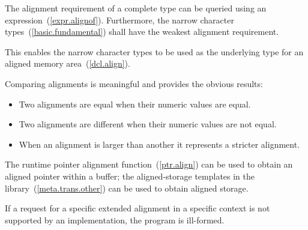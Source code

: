 \pnum
The alignment requirement of a complete type can be queried using an
 expression~(\ref{expr.alignof}). Furthermore,
the narrow character types~(\ref{basic.fundamental}) shall have the weakest
alignment requirement.
\begin{note} This enables the narrow character types to be used as the
underlying type for an aligned memory area~(\ref{dcl.align}).\end{note}

\pnum
Comparing alignments is meaningful and provides the obvious results:

\begin{itemize}
\item Two alignments are equal when their numeric values are equal.
\item Two alignments are different when their numeric values are not equal.
\item When an alignment is larger than another it represents a stricter alignment.
\end{itemize}

\pnum
\begin{note} The runtime pointer alignment function~(\ref{ptr.align})
can be used to obtain an aligned pointer within a buffer; the aligned-storage templates
in the library~(\ref{meta.trans.other}) can be used to obtain aligned storage.
\end{note}

\pnum
If a request for a specific extended alignment in a specific context is not
supported by an implementation, the program is ill-formed.
